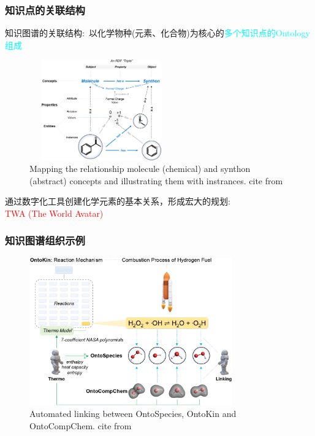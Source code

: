 \frame
{
	\frametitle{知识点的关联结构}
	知识图谱的关联结构:~以化学物种(元素、化合物)为核心的\textcolor{cyan}{多个知识点的\textrm{Ontology}组成}
\begin{figure}[h!]
\centering
\vskip -5pt
\includegraphics[height=1.70in,width=2.45in,viewport=0 0 950 790,clip]{Figures/Mapping-the-relationship-between-molecule-and-synthon.png}
\caption{\tiny\textrm{Mapping the relationship molecule (chemical) and synthon (abstract) concepts and illustrating them with instrances. cite from~\cite{ACR56-128_2023}}}%
\label{Fig:Mapping-relationship-molecule-synthon}
\end{figure}
通过数字化工具创建化学元素的基本关系，形成宏大的规划:~\\
\textcolor{red}{\textrm{TWA (The World Avatar)}}
}

\frame
{
	\frametitle{知识图谱组织示例}
\begin{figure}[h!]
\centering
\vskip -8pt
\includegraphics[height=2.50in,width=3.45in,viewport=0 0 1010 750,clip]{Figures/Automated-linking-between-OntoSepcies-Kin-CompChem.png}
\caption{\tiny\textrm{Automated linking between OntoSpecies, OntoKin and OntoCompChem. cite from~\cite{ACR56-128_2023}}}%
\label{Fig:Automated-linking-between-OntoSpecies-Kin-CompChem}
\end{figure}
}

